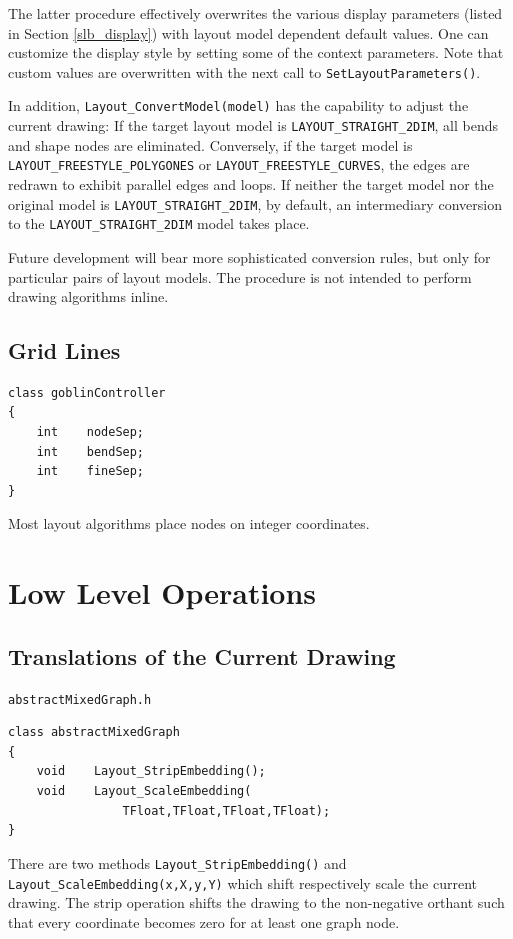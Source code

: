 \documentclass[a4paper,11pt,twoside]{book}
\begin{document}
\begin{multicols}{2}
The latter procedure effectively overwrites the various display parameters
(listed in Section \ref{slb_display}) with layout model dependent default
values. One can customize the display style by setting some of the context
parameters. Note that custom values are overwritten with the next call to
\verb/SetLayoutParameters()/.

In addition, \verb/Layout_ConvertModel(model)/ has the capability to adjust the
current drawing: If the target layout model is \verb/LAYOUT_STRAIGHT_2DIM/,
all bends and shape nodes are eliminated. Conversely, if the target model is
\verb/LAYOUT_FREESTYLE_POLYGONES/ or \verb/LAYOUT_FREESTYLE_CURVES/, the edges
are redrawn to exhibit parallel edges and loops. If neither the target model
nor the original model is \verb/LAYOUT_STRAIGHT_2DIM/, by default, an
intermediary conversion to the \verb/LAYOUT_STRAIGHT_2DIM/ model takes place.

Future development will bear more sophisticated conversion rules, but only for
particular pairs of layout models. The procedure is not intended to perform
drawing algorithms inline.


\subsection{Grid Lines}
\label{slb_grid lines}
\begin{mymethods}
\begin{verbatim}
class goblinController
{
    int    nodeSep;
    int    bendSep;
    int    fineSep;
}
\end{verbatim}
\end{mymethods}
Most layout algorithms place nodes on integer coordinates.


\section{Low Level Operations}

\subsection{Translations of the Current Drawing}
\label{slb_translate_drawing}
\myinclude\verb/abstractMixedGraph.h/
\begin{mymethods}
\begin{verbatim}
class abstractMixedGraph
{
    void    Layout_StripEmbedding();
    void    Layout_ScaleEmbedding(
                TFloat,TFloat,TFloat,TFloat);
}
\end{verbatim}
\end{mymethods}
There are two methods \verb/Layout_StripEmbedding()/ and
\verb/Layout_ScaleEmbedding(x,X,y,Y)/ which shift respectively scale the
current drawing. The strip operation shifts the drawing to the non-negative
orthant such that every coordinate becomes zero for at least one graph node.


\end{multicols}
\end{document}
